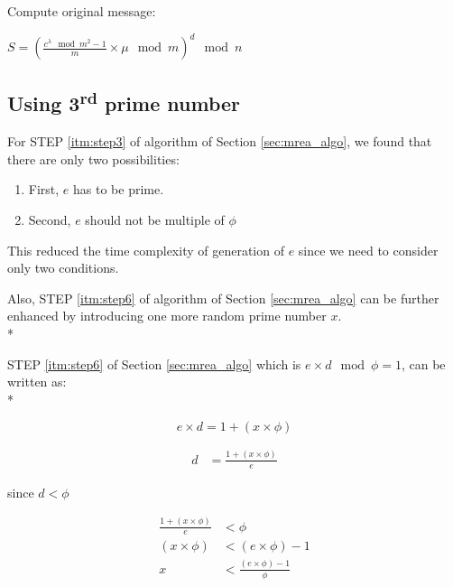 \documentclass[12pt,journal,compsoc]{IEEEtran}
\begin{document}
Compute original message:
\begin{center}
	$S = (\frac{c^{\lambda}\mod m^{2}-1}{m}\times \mu \mod m)^{d} \mod n$
\end{center}

\par

\subsection{\bf Using 3\textsuperscript{rd} prime number}%
\par \par
For STEP \ref{itm:step3} of algorithm of Section \ref{sec:mrea_algo}, we found that there are only two possibilities:

\begin{enumerate}
	\item First, $e$ has to be prime.
	\item Second, $e$ should not be multiple of $\phi$
\end{enumerate}
This reduced the time complexity of generation of $e$ since we need to consider only two conditions.

Also, STEP \ref{itm:step6} of algorithm of Section \ref{sec:mrea_algo} can be further enhanced by introducing one more random prime number $x$. \\*

STEP \ref{itm:step6} of Section \ref{sec:mrea_algo} which is $e \times d \mod \phi = 1$, can be written as:\\* 

\begin{equation}
e \times d = 1 + (x \times \phi)
\end{equation}

\begin{align*}
	d &= \frac{1 + (x\times\phi)}{e}
\end{align*}

since $d < \phi$

\begin{align*}
	\frac{1 + (x \times \phi)}{e} &< \phi \\
	(x \times \phi) &< (e \times \phi) -1 \\
	x &< \frac{(e \times \phi) -1}{\phi} \\
\end{align*}
\end{document}
